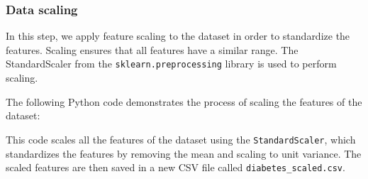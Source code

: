 \subsubsection{Data scaling}

In this step, we apply feature scaling to the dataset in order to standardize the features. Scaling ensures that all features have a similar range. The StandardScaler from the \texttt{sklearn.preprocessing} library is used to perform scaling.

The following Python code demonstrates the process of scaling the features of the dataset:




This code scales all the features of the dataset using the \texttt{StandardScaler}, which standardizes the features by removing the mean and scaling to unit variance. The scaled features are then saved in a new CSV file called \texttt{diabetes\_scaled.csv}. 
